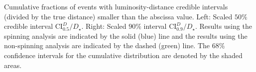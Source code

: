 \label{fig:distance} Cumulative fractions of events with luminosity-distance credible intervals (divided by the true distance) smaller than the abscissa value. Left: Scaled $50\%$ credible interval $\mathrm{CI}^{D}_{0.5}/D_\star$. Right: Scaled $90\%$ interval $\mathrm{CI}^{D}_{0.9}/D_\star$. Results using the spinning analysis are indicated by the solid (blue) line and the results using the non-spinning analysis \citep{Berry_2014} are indicated by the dashed (green) line. The $68\%$ confidence intervals for the cumulative distribution are denoted by the shaded areas.
  